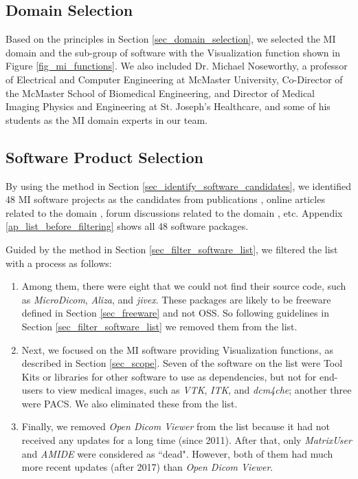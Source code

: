 \subsection{Domain Selection}
Based on the principles in Section \ref{sec_domain_selection}, we selected the MI domain and the sub-group of software with the Visualization function shown in Figure \ref{fig_mi_functions}. We also included Dr. Michael Noseworthy, a professor of Electrical and Computer Engineering at McMaster University, Co-Director of the McMaster School of Biomedical Engineering, and Director of Medical Imaging Physics and Engineering at St. Joseph’s Healthcare, and some of his students as the MI domain experts in our team.

\subsection{Software Product Selection}
\label{sec_mi_software_selection}
By using the method in Section \ref{sec_identify_software_candidates}, we identified 48 MI software projects as the candidates from publications \cite{Bjorn2017} \cite{Bruhschwein2019} \cite{Haak2015}, online articles related to the domain \cite{Emms2019} \cite{Hasan2020} \cite{Mu2019}, forum discussions related to the domain \cite{Samala2014}, etc. Appendix \ref{ap_list_before_filtering} shows all 48 software packages.

Guided by the method in Section \ref{sec_filter_software_list}, we filtered the list with a process as follows:

\begin{enumerate}
\item Among them, there were eight that we could not find their source code, such as \textit{MicroDicom}, \textit{Aliza}, and \textit{jivex}. These packages are likely to be freeware defined in Section \ref{sec_freeware} and not OSS. So following guidelines in Section \ref{sec_filter_software_list} we removed them from the list.

\item Next, we focused on the MI software providing Visualization functions, as described in Section \ref{sec_scope}. Seven of the software on the list were Tool Kits or libraries for other software to use as dependencies, but not for end-users to view medical images, such as \textit{VTK}, \textit{ITK}, and \textit{dcm4che}; another three were PACS. We also eliminated these from the list.

\item Finally, we removed \textit{Open Dicom Viewer} from the list because it had not received any updates for a long time (since 2011). After that, only \textit{MatrixUser} and \textit{AMIDE} were considered as ``dead". However, both of them had much more recent updates (after 2017) than \textit{Open Dicom Viewer}.
\end{enumerate}

